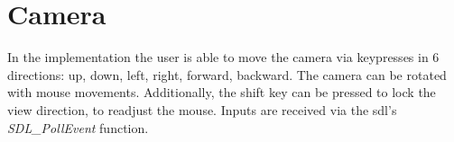 












\section{Camera}
In the implementation the user is able to move the camera via keypresses in 6 directions: up, down, left, right, forward, backward. The camera can be rotated  with mouse movements. Additionally, the shift key can be pressed to lock the view direction, to readjust the mouse. Inputs are received via the \gls{sdl}'s \cite{sdl} \textit{SDL\_PollEvent} function.

